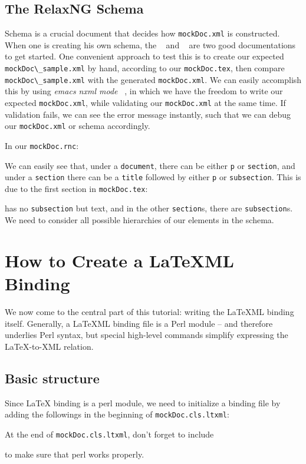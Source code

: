 \documentclass[a4paper]{article}
\def\latexml{{\LaTeX}ML\xspace}
\begin{document}
\subsection{The RelaxNG Schema}\label{sec:rnc}
Schema is a crucial document that decides how \lstinline|mockDoc.xml| is constructed. When
one is creating his own schema, the ~\cite{RelaxNG:tutorial} and ~\cite{XML:tutorial} are two
good documentations to get started. One convenient approach to test this is to create our
expected \lstinline|mockDoc\_sample.xml| by hand, according to our
\lstinline|mockDoc.tex|, then compare \lstinline|mockDoc\_sample.xml| with the generated
\lstinline|mockDoc.xml|. We can easily accomplish this by using \textit{emacs nxml
  mode} ~\cite{Emacs:nxml}, in which we have the freedom to write
our expected \lstinline|mockDoc.xml|, while validating our \lstinline|mockDoc.xml| at
the same time. If validation fails, we can see the error message instantly, such that we
can debug our \lstinline|mockDoc.xml| or schema accordingly.

In our \lstinline|mockDoc.rnc|:

We can easily see that, under a \lstinline|document|, there can be either \lstinline|p| or \lstinline|section|, and under a \lstinline|section| there can be a \lstinline|title| followed by either \lstinline|p| or \lstinline|subsection|. This is due to the first section in \lstinline|mockDoc.tex|:

has no \lstinline|subsection| but text, and in the other \lstinline|section|s, there are \lstinline|subsection|s. We need to consider all possible hierarchies of our elements in the schema.



\section{How to Create a \latexml Binding}\label{sec:bind}
We now come to the central part of this tutorial: writing the \latexml binding
itself. Generally, a \latexml binding file is a Perl module -- and therefore underlies
Perl syntax, but special high-level commands simplify expressing the {\LaTeX}-to-XML
relation.

\subsection{Basic structure}
Since {\LaTeX} binding is a perl module, we need to initialize a binding file by adding
the followings in the beginning of \lstinline|mockDoc.cls.ltxml|:

At the end of \lstinline|mockDoc.cls.ltxml|, don't forget to include

to make sure that perl works properly.
\end{document}
